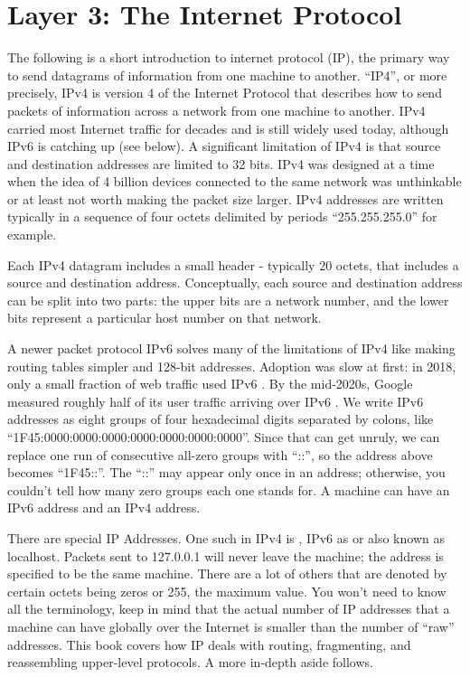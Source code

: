 \section{Layer 3: The Internet Protocol}

The following is a short introduction to internet protocol (IP), the primary way to send datagrams of information from one machine to another.
``IP4'', or more precisely, IPv4 is version 4 of the Internet Protocol that describes how to send packets of information across a network from one machine to another.
IPv4 carried most Internet traffic for decades and is still widely used today, although IPv6 is catching up (see below).
A significant limitation of IPv4 is that source and destination addresses are limited to 32 bits.
IPv4 was designed at a time when the idea of 4 billion devices connected to the same network was unthinkable or at least not worth making the packet size larger.
IPv4 addresses are written typically in a sequence of four octets delimited by periods ``255.255.255.0'' for example.

Each IPv4 datagram includes a small header - typically 20 octets, that includes a source and destination address.
Conceptually, each source and destination address can be split into two parts: the upper bits are a network number, and the lower bits represent a particular host number on that network.

A newer packet protocol IPv6 solves many of the limitations of IPv4 like making routing tables simpler and 128-bit addresses.
Adoption was slow at first: in 2018, only a small fraction of web traffic used IPv6 \cite{internet_society_2018}.
By the mid-2020s, Google measured roughly half of its user traffic arriving over IPv6 \cite{google_ipv6_stats}.
We write IPv6 addresses as eight groups of four hexadecimal digits separated by colons, like ``1F45:0000:0000:0000:0000:0000:0000:0000''.
Since that can get unruly, we can replace one run of consecutive all-zero groups with ``::'', so the address above becomes ``1F45::''.
The ``::'' may appear only once in an address; otherwise, you couldn't tell how many zero groups each one stands for.
A machine can have an IPv6 address and an IPv4 address.

There are special IP Addresses.
One such in IPv4 is , IPv6 as  or  also known as localhost.
Packets sent to 127.0.0.1 will never leave the machine; the address is specified to be the same machine.
There are a lot of others that are denoted by certain octets being zeros or 255, the maximum value. You won't need to know all the terminology, keep in mind that the actual number of IP addresses that a machine can have globally over the Internet is smaller than the number of ``raw'' addresses.
This book covers how IP deals with routing, fragmenting, and reassembling upper-level protocols. A more in-depth aside follows.

